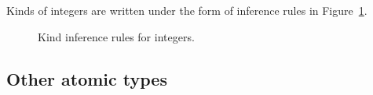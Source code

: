 Kinds of integers are written under the form of inference rules in Figure~\ref{fig:nstar-common-ts-integer-kindrules}.

\begin{figure}[htb]
	\centering


	\caption{Kind inference rules for integers.}
	\label{fig:nstar-common-ts-integer-kindrules}
\end{figure}

\subsection{Other atomic types}\label{subsec:nstar-common-ts-otheratomic}

